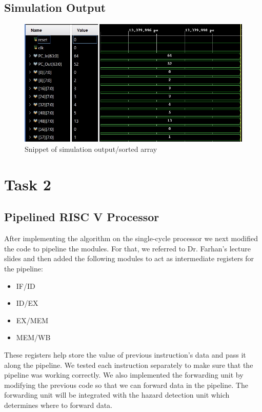\documentclass[12pt]{article}
\begin{document}
\subsection{Simulation Output}\label{code1}
    \begin{figure}[htbp!]
        \centering
        \includegraphics[scale = 0.53]{images/taks1.jpeg}
        \caption{Snippet of simulation output/sorted array}
    \end{figure}

\section{Task 2}\label{task2}
    \subsection{Pipelined RISC V Processor}\label{task2intro}
    After implementing the algorithm on the single-cycle processor we next modified the code to pipeline the modules. For that, we referred to Dr. Farhan's lecture slides and then added the following modules to act as intermediate registers for the pipeline:
    \begin{itemize}
        \item IF/ID
        \item ID/EX
        \item EX/MEM
        \item MEM/WB
    \end{itemize}
    These registers help store the value of previous instruction's data and pass it along the pipeline. We tested each instruction separately to make sure that the pipeline was working correctly. We also implemented the forwarding unit by modifying the previous code so that we can forward data in the pipeline. The forwarding unit will be integrated with the hazard detection unit which determines where to forward data.
\newpage
\end{document}
